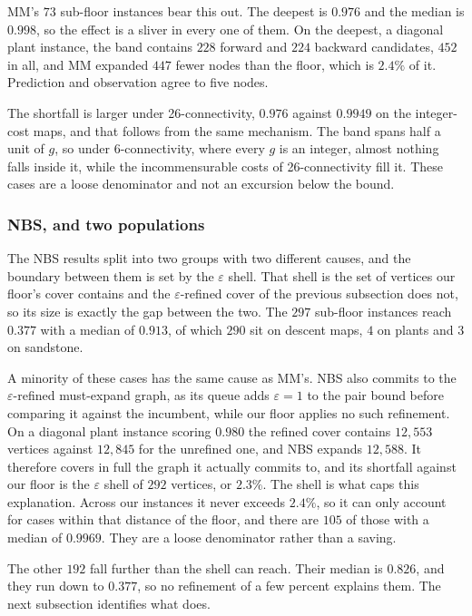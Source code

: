 \documentclass[letterpaper]{article} %
\begin{document}
MM's $73$ sub-floor instances bear this out. The deepest is $0.976$ and the median is $0.998$, so the effect is a sliver in every one of them. On the deepest, a diagonal plant instance, the band contains $228$ forward and $224$ backward candidates, $452$ in all, and MM expanded $447$ fewer nodes than the floor, which is $2.4\%$ of it. Prediction and observation agree to five nodes.

The shortfall is larger under 26-connectivity, $0.976$ against $0.9949$ on the integer-cost maps, and that follows from the same mechanism. The band spans half a unit of $g$, so under 6-connectivity, where every $g$ is an integer, almost nothing falls inside it, while the incommensurable costs of 26-connectivity fill it. These cases are a loose denominator and not an excursion below the bound.

\subsubsection{NBS, and two populations}
The NBS results split into two groups with two different causes, and the boundary between them is set by the $\varepsilon$ shell. That shell is the set of vertices our floor's cover contains and the $\varepsilon$-refined cover of the previous subsection does not, so its size is exactly the gap between the two. The $297$ sub-floor instances reach $0.377$ with a median of $0.913$, of which $290$ sit on descent maps, $4$ on plants and $3$ on sandstone.

A minority of these cases has the same cause as MM's. NBS also commits to the $\varepsilon$-refined must-expand graph, as its queue adds $\varepsilon=1$ to the pair bound before comparing it against the incumbent, while our floor applies no such refinement. On a diagonal plant instance scoring $0.980$ the refined cover contains $12{,}553$ vertices against $12{,}845$ for the unrefined one, and NBS expands $12{,}588$. It therefore covers in full the graph it actually commits to, and its shortfall against our floor is the $\varepsilon$ shell of $292$ vertices, or $2.3\%$. The shell is what caps this explanation. Across our instances it never exceeds $2.4\%$, so it can only account for cases within that distance of the floor, and there are $105$ of those with a median of $0.9969$. They are a loose denominator rather than a saving.

The other $192$ fall further than the shell can reach. Their median is $0.826$, and they run down to $0.377$, so no refinement of a few percent explains them. The next subsection identifies what does.
\end{document}
